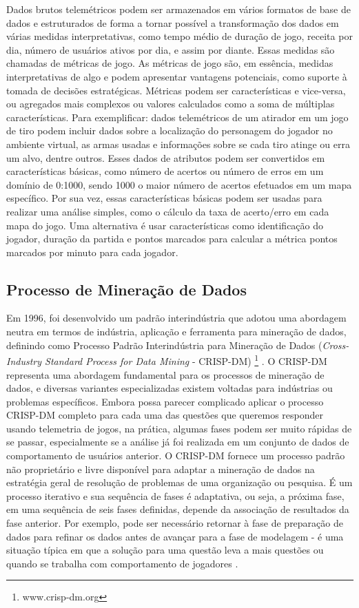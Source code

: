Dados brutos telemétricos podem ser armazenados em vários formatos de base de dados e estruturados de forma a tornar possível a transformação dos dados em várias medidas interpretativas, como tempo médio de duração de jogo, receita por dia, número de usuários ativos por dia, e assim por diante. Essas medidas são chamadas de métricas de jogo. As métricas de jogo são, em essência, medidas interpretativas de algo e podem apresentar vantagens potenciais, como suporte à tomada de decisões estratégicas. Métricas podem ser características e vice-versa, ou agregados mais complexos ou valores calculados como a soma de múltiplas características. Para exemplificar: dados telemétricos de um atirador em um jogo de tiro podem incluir dados sobre a localização do personagem do jogador no ambiente virtual, as armas usadas e informações sobre se cada tiro atinge ou erra um alvo, dentre outros. Esses dados de atributos podem ser convertidos em características básicas, como número de acertos ou número de erros em um domínio de 0:1000, sendo 1000 o maior número de acertos efetuados em um mapa específico. Por sua vez, essas características básicas podem ser usadas para realizar uma análise simples, como o cálculo da taxa de acerto/erro em cada mapa do jogo. Uma alternativa é usar características como identificação do jogador, duração da partida e pontos marcados para calcular a métrica pontos marcados por minuto para cada jogador.

\subsection{Processo de Mineração de Dados}
Em 1996, foi desenvolvido um padrão interindústria que adotou uma abordagem neutra em termos de indústria, aplicação e ferramenta para mineração de dados, definindo como Processo Padrão Interindústria para Mineração de Dados (\textit{Cross-Industry Standard Process for Data Mining} - CRISP-DM) \footnote{www.crisp-dm.org} \cite{chapman2000crisp}. O CRISP-DM representa uma abordagem fundamental para os processos de mineração de dados, e diversas variantes especializadas existem voltadas para indústrias ou problemas específicos. Embora possa parecer complicado aplicar o processo CRISP-DM completo para cada uma das questões que queremos responder usando telemetria de jogos, na prática, algumas fases podem ser muito rápidas de se passar, especialmente se a análise já foi realizada em um conjunto de dados de comportamento de usuários anterior. O CRISP-DM fornece um processo padrão não proprietário e livre disponível para adaptar a mineração de dados na estratégia geral de resolução de problemas de uma organização ou pesquisa. É um processo iterativo e sua sequência de fases é adaptativa, ou seja, a próxima fase, em uma sequência de seis fases definidas, depende da associação de resultados da fase anterior. Por exemplo, pode ser necessário retornar à fase de preparação de dados para refinar os dados antes de avançar para a fase de modelagem - é uma situação típica em que a solução para uma questão leva a mais questões ou quando se trabalha com comportamento de jogadores \cite{el2016game}.

